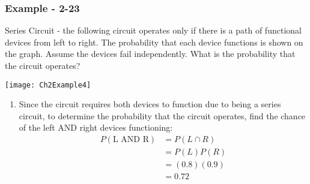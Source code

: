 \documentclass[../INDE315.tex]{subfiles}
\begin{document}
\subsubsection*{Example - 2-23}
\begin{exmp}
    Series Circuit - the following circuit operates only if there is a path of functional devices from left to right. The probability that each device functions is shown on the graph. Assume the devices fail independently. What is the probability that the circuit operates?
    \begin{center}
        \texttt{[image: Ch2Example4]}
    \end{center}
\end{exmp}
\begin{enumerate}
    \item Since the circuit requires both devices to function due to being a series circuit, to determine the probability that the circuit operates, find the chance of the left AND right devices functioning:
        \begin{equation*}
            \begin{aligned}
                P(\text{L AND R}) &= P(L \cap R) \\
                        &= P(L) P(R) \\
                        &= (0.8)(0.9) \\
                        &= 0.72
            \end{aligned}
        \end{equation*}
\end{enumerate}
\end{document}
